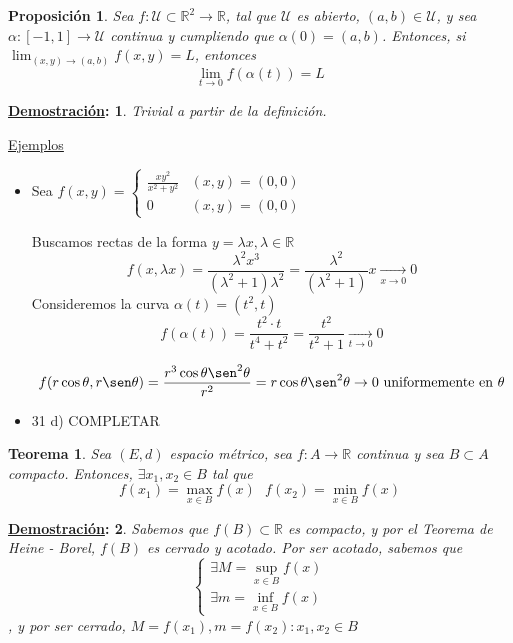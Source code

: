 \documentclass[10pt,a4paper,openright]{book}
\theoremstyle{break}
\newtheorem*{theo}{Teorema}
\newtheorem*{prop}{Proposición}
\newtheorem*{demo}{\underline{Demostración}:}
\begin{document}
\begin{prop}
Sea $f: \mathcal{U} \subset \mathbb{R}^2 \to \mathbb{R}$, tal que $\mathcal{U}$ es abierto, $(a,b) \in \mathcal{U}$, y sea $\alpha: [-1,1] \to \mathcal{U}$ continua y cumpliendo que $\alpha(0) = (a,b)$. Entonces, si $\lim_{(x,y) \to (a,b)} f(x,y) = L$, entonces $$\lim_{t \to 0} f(\alpha(t)) = L$$
\end{prop}

\begin{demo}
Trivial a partir de la definición.
\end{demo}

\underline{Ejemplos}
\begin{itemize}
\item Sea $f(x,y) = \begin{cases} \frac{xy^2}{x^2 + y^2} & (x,y) = (0,0) \\ 0 & (x,y) = (0,0) \end{cases}$

Buscamos rectas de la forma $y = \lambda x, \lambda \in \mathbb{R}$
$$f(x,\lambda x) = \frac{\lambda^2x^3}{(\lambda^2 + 1) \lambda^2} = \frac{\lambda^2}{(\lambda^2 + 1)} x \xrightarrow[x \to 0]{} 0$$
Consideremos la curva $\alpha(t)= (t^2, t)$
$$f(\alpha(t)) = \frac{t^2 \cdot t}{t^4 + t^2} = \frac{t^2}{t^2 + 1} \xrightarrow[t \to 0]{} 0$$

$$f(r \cos \theta, r \sen \theta) = \frac{r^3 \cos\theta \sen^2 \theta}{r^2} = r \cos \theta \sen^2 \theta \rightarrow 0 \mbox{ uniformemente en } \theta $$

\item 31 d) COMPLETAR

\end{itemize}

\begin{theo}
Sea $(E,d)$ espacio métrico, sea $f: A \to \mathbb{R}$ continua y sea $B \subset A$ compacto. Entonces, $\exists x_1, x_2 \in B$ tal que $$f(x_1) = \max_{x \in B} f(x) \ \ \ f(x_2) = \min_{x \in B} f(x)$$
\end{theo}

\begin{demo}
Sabemos que $f(B) \subset \mathbb{R}$ es compacto, y por el Teorema de Heine - Borel, $f(B)$ es cerrado y acotado. Por ser acotado, sabemos que $$\begin{cases} \exists M = \displaystyle \sup_{x \in B} f(x) \\ \exists m =  \displaystyle \inf_{x \in B} f(x) \end{cases}$$, y por ser cerrado, $M = f(x_1), m = f(x_2) : x_1, x_2 \in B$
\end{demo}
\end{document}
